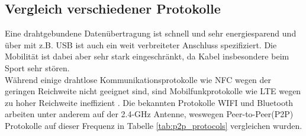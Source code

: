 \subsection{Vergleich verschiedener Protokolle}
Eine drahtgebundene Datenübertragung ist schnell und sehr energiesparend und über mit z.B. USB ist auch ein weit verbreiteter Anschluss spezifiziert.
Die Mobilität ist dabei aber sehr stark eingeschränkt, da Kabel insbesondere beim Sport sehr stören.\\
Während einige drahtlose Kommunikationsprotokolle wie NFC wegen der geringen Reichweite nicht geeignet sind, sind Mobilfunkprotokolle wie LTE wegen zu hoher Reichweite ineffizient \cite{comparison_wifi_lte}.
Die bekannten Protokolle WIFI und Bluetooth arbeiten unter anderem auf der 2.4-GHz Antenne, weswegen Peer-to-Peer(P2P) Protokolle auf dieser Frequenz in Tabelle \ref{tab:p2p_protocols} vergleichen wurden.
